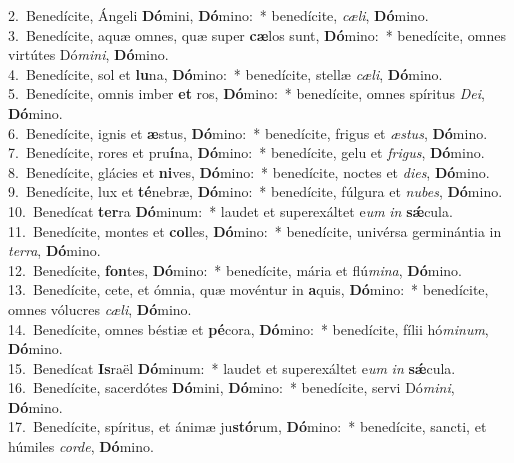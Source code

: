 {2.~}Benedícite, Ángeli \textbf{Dó}mini, \textbf{Dó}mino:~* benedícite, \textit{cæ}\textit{li}, \textbf{Dó}mino.\\
{3.~}Benedícite, aquæ omnes, quæ super \textbf{cæ}los sunt, \textbf{Dó}mino:~* benedícite, omnes virtútes Dó\textit{mi}\textit{ni}, \textbf{Dó}mino.\\
{4.~}Benedícite, sol et \textbf{lu}na, \textbf{Dó}mino:~* benedícite, stellæ \textit{cæ}\textit{li}, \textbf{Dó}mino.\\
{5.~}Benedícite, omnis imber \textbf{et} ros, \textbf{Dó}mino:~* benedícite, omnes spíritus \textit{De}\textit{i}, \textbf{Dó}mino.\\
{6.~}Benedícite, ignis et \textbf{æ}stus, \textbf{Dó}mino:~* benedícite, frigus et \textit{æ}\textit{stus}, \textbf{Dó}mino.\\
{7.~}Benedícite, rores et pru\textbf{í}na, \textbf{Dó}mino:~* benedícite, gelu et \textit{fri}\textit{gus}, \textbf{Dó}mino.\\
{8.~}Benedícite, glácies et \textbf{ni}ves, \textbf{Dó}mino:~* benedícite, noctes et \textit{di}\textit{es}, \textbf{Dó}mino.\\
{9.~}Benedícite, lux et \textbf{té}nebræ, \textbf{Dó}mino:~* benedícite, fúlgura et \textit{nu}\textit{bes}, \textbf{Dó}mino.\\
{10.~}Benedícat \textbf{ter}ra \textbf{Dó}minum:~* laudet et superexáltet e\textit{um} \textit{in} \textbf{sǽ}cula.\\
{11.~}Benedícite, montes et \textbf{col}les, \textbf{Dó}mino:~* benedícite, univérsa germinántia in \textit{ter}\textit{ra}, \textbf{Dó}mino.\\
{12.~}Benedícite, \textbf{fon}tes, \textbf{Dó}mino:~* benedícite, mária et flú\textit{mi}\textit{na}, \textbf{Dó}mino.\\
{13.~}Benedícite, cete, et ómnia, quæ movéntur in \textbf{a}quis, \textbf{Dó}mino:~* benedícite, omnes vólucres \textit{cæ}\textit{li}, \textbf{Dó}mino.\\
{14.~}Benedícite, omnes béstiæ et \textbf{pé}cora, \textbf{Dó}mino:~* benedícite, fílii hó\textit{mi}\textit{num}, \textbf{Dó}mino.\\
{15.~}Benedícat \textbf{Is}raël \textbf{Dó}minum:~* laudet et superexáltet e\textit{um} \textit{in} \textbf{sǽ}cula.\\
{16.~}Benedícite, sacerdótes \textbf{Dó}mini, \textbf{Dó}mino:~* benedícite, servi Dó\textit{mi}\textit{ni}, \textbf{Dó}mino.\\
{17.~}Benedícite, spíritus, et ánimæ ju\textbf{stó}rum, \textbf{Dó}mino:~* benedícite, sancti, et húmiles \textit{cor}\textit{de}, \textbf{Dó}mino.\\
